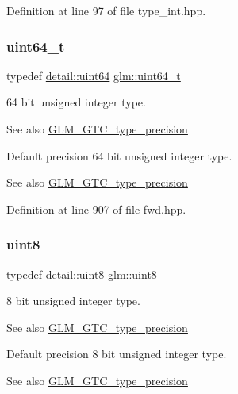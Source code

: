 Definition at line 97 of file type\+\_\+int.\+hpp.

\mbox{\label{group__gtc__type__precision_ga058f57c19e1befdcf12498944bd73e69}} 
\subsubsection{\texorpdfstring{uint64\+\_\+t}{uint64\_t}}
{\footnotesize\ttfamily typedef \hyperlink{namespaceglm_1_1detail_adec4b19bf4982125e122db2fe03c5810}{detail\+::uint64} \hyperlink{group__gtc__type__precision_ga058f57c19e1befdcf12498944bd73e69}{glm\+::uint64\+\_\+t}}

64 bit unsigned integer type. \begin{DoxySeeAlso}{See also}
\hyperlink{group__gtc__type__precision}{G\+L\+M\+\_\+\+G\+T\+C\+\_\+type\+\_\+precision}
\end{DoxySeeAlso}
Default precision 64 bit unsigned integer type. \begin{DoxySeeAlso}{See also}
\hyperlink{group__gtc__type__precision}{G\+L\+M\+\_\+\+G\+T\+C\+\_\+type\+\_\+precision} 
\end{DoxySeeAlso}


Definition at line 907 of file fwd.\+hpp.

\mbox{\label{group__gtc__type__precision_ga1a7dcd8aac97cc8020817c94049deff2}} 
\subsubsection{\texorpdfstring{uint8}{uint8}}
{\footnotesize\ttfamily typedef \hyperlink{namespaceglm_1_1detail_aef2588f97d090cc19fbbe0c74fe17c8f}{detail\+::uint8} \hyperlink{group__gtc__type__precision_ga1a7dcd8aac97cc8020817c94049deff2}{glm\+::uint8}}

8 bit unsigned integer type. \begin{DoxySeeAlso}{See also}
\hyperlink{group__gtc__type__precision}{G\+L\+M\+\_\+\+G\+T\+C\+\_\+type\+\_\+precision}
\end{DoxySeeAlso}
Default precision 8 bit unsigned integer type. \begin{DoxySeeAlso}{See also}
\hyperlink{group__gtc__type__precision}{G\+L\+M\+\_\+\+G\+T\+C\+\_\+type\+\_\+precision} 
\end{DoxySeeAlso}


